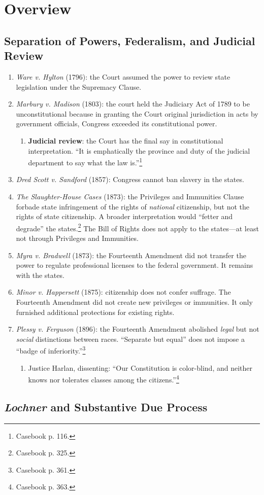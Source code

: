 \section{Overview}

\subsection{Separation of Powers, Federalism, and Judicial Review}

\begin{enumerate}
    \item \emph{Ware v. Hylton} (1796): the Court assumed the power to review 
    state legislation under the Supremacy Clause.
    \item \emph{Marbury v. Madison} (1803): the court held the Judiciary Act 
    of 1789 to be unconstitutional because in granting the Court original 
    jurisdiction in acts by government officials, Congress exceeded its 
    constitutional power.
    \begin{enumerate}
        \item \textbf{Judicial review}: the Court has the final say in 
        constitutional interpretation.  ``It is emphatically the province and 
        duty of the judicial department to say what the law 
        is.''\footnote{Casebook p. 116.}
    \end{enumerate}
    \item \emph{Dred Scott v. Sandford} (1857): Congress cannot ban slavery in 
    the states.
    \item \emph{The Slaughter-House Cases} (1873): the Privileges and 
    Immunities Clause forbade state infringement of the rights of 
    \emph{national} citizenship, but not the rights of state citizenship. A 
    broader interpretation would ``fetter and degrade'' the 
    states.\footnote{Casebook p. 325.} The Bill of Rights does not apply to 
    the states---at least not through Privileges and Immunities.
    \item \emph{Myra v. Bradwell} (1873): the Fourteenth Amendment did not 
    transfer the power to regulate professional licenses to the federal 
    government. It remains with the states.
    \item \emph{Minor v. Happersett} (1875): citizenship does not confer 
    suffrage.  The Fourteenth Amendment did not create new privileges or 
    immunities. It 
    only furnished additional protections for existing rights.
    \item \emph{Plessy v. Ferguson} (1896): the Fourteenth Amendment abolished 
    \emph{legal} but not \emph{social} distinctions between races. ``Separate 
    but equal'' does not impose a ``badge of inferiority.''\footnote{Casebook 
    p. 361.}
    \begin{enumerate}
        \item Justice Harlan, dissenting: ``Our Constitution is color-blind, 
        and neither knows nor tolerates classes among the 
        citizens.''\footnote{Casebook p. 363.}
    \end{enumerate}
\end{enumerate}

\subsection{\emph{Lochner} and Substantive Due Process}
